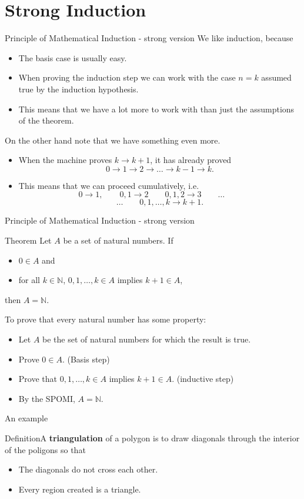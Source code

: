 \documentclass{beamer}
\def\bl[#1]#2{\begin{block}{#1}#2\end{block}}
\def\itemb{\begin{itemize}}
\def\iteme{\end{itemize}}
\begin{document}
\section{Strong Induction}

\begin{frame}{Principle of Mathematical Induction - strong version}
We like induction, because
\itemb
\item The basis case is usually easy.
\item When proving the induction step we can work with the case $n=k$ assumed true by the induction hypothesis.
\item This means that we have a lot more to work with than just the assumptions of the theorem.
\iteme

On the other hand note that we have something even more.
\itemb
\item When the machine proves $k\to k+1$, it has already proved
\[
0\to 1\to 2\to\dots\to k-1\to k.
\]
\item This means that we can proceed cumulatively, i.e.
\[
0\to 1,\qquad 0,1\to 2\qquad 0,1,2\to 3\qquad\dots\qquad
\]
\[
\dots\qquad 0,1,\dots,k\to k+1.
\]
\iteme
\end{frame}

\begin{frame}{Principle of Mathematical Induction - strong version}
\bl[Theorem]{
Let $A$ be a set of natural numbers. If
\itemb
\item $0\in A$ and
\item for all $k\in\mathbb{N}$, $0,1,\dots,k\in A$ implies $k+1\in A$,
\iteme
then $A=\mathbb{N}$.}

\bl[]{
To prove that every natural number has some property:
\itemb
\item Let $A$ be the set of natural numbers for which the result is true.
\item Prove $0\in A$. (Basis step)
\item Prove that $0,1,\dots, k\in A$ implies $k+1\in A$. (inductive step)
\item By the SPOMI, $A=\mathbb{N}$.
\iteme}
\end{frame}

\begin{frame}{An example}
\bl[Definition]{A \textbf{triangulation} of a polygon is to draw diagonals through the interior of the poligons so that
\itemb
\item The diagonals do not cross each other.
\item Every region created is a triangle.
\iteme}
\begin{figure}
\centering
{}
\end{figure}
\end{frame}
\end{document}
